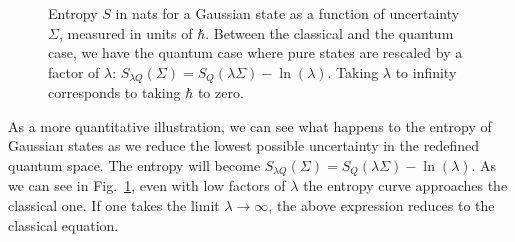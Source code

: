 \documentclass{SciPost}
\begin{document}
\begin{figure}[h]
	\centering
	\caption{Entropy $S$ in nats for a Gaussian state as a function of uncertainty $\Sigma$, measured in units of $\hbar$. Between the classical and the quantum case, we have the quantum case where pure states are rescaled by a factor of $\lambda$: $S_{\lambda Q}(\Sigma) = S_Q(\lambda \Sigma) - \ln(\lambda)$. Taking $\lambda$ to infinity corresponds to taking $\hbar$ to zero.}
	\label{fig:uncertainty_scaled}
\end{figure}

As a more quantitative illustration, we can see what happens to the entropy of Gaussian states as we reduce the lowest possible uncertainty in the redefined quantum space. The entropy will become $S_{\lambda Q}(\Sigma) = S_Q(\lambda \Sigma) - \ln(\lambda)$. As we can see in Fig.~\ref{fig:uncertainty_scaled}, even with low factors of $\lambda$ the entropy curve approaches the classical one. If one takes the limit $\lambda \to \infty$, the above expression reduces to the classical equation.
\end{document}
